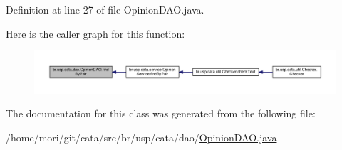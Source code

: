 Definition at line 27 of file Opinion\+D\+A\+O.\+java.



Here is the caller graph for this function\+:\nopagebreak
\begin{figure}[H]
\begin{center}
\leavevmode
\includegraphics[width=350pt]{classbr_1_1usp_1_1cata_1_1dao_1_1_opinion_d_a_o_ac6fa01588cd586f5375169841662c569_icgraph}
\end{center}
\end{figure}




The documentation for this class was generated from the following file\+:\begin{DoxyCompactItemize}
\item 
/home/mori/git/cata/src/br/usp/cata/dao/\hyperlink{_opinion_d_a_o_8java}{Opinion\+D\+A\+O.\+java}\end{DoxyCompactItemize}
